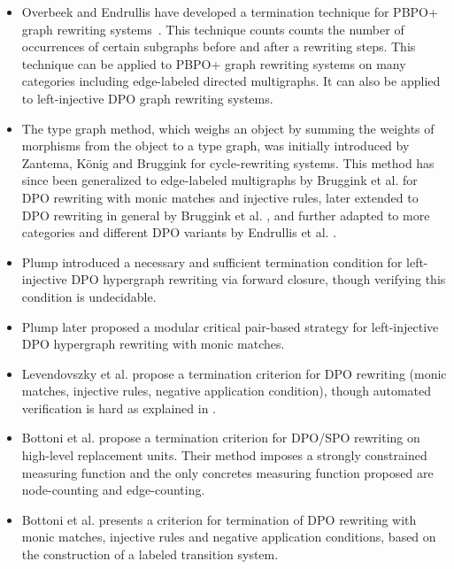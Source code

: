 \begin{itemize}
    \item Overbeek and Endrullis have developed a termination technique for PBPO+ graph rewriting systems~\cite{overbeek2024termination_lmcs}. This technique counts counts the number of occurrences of certain subgraphs before and after a rewriting steps. This technique can be applied to PBPO+ graph rewriting systems on many categories including edge-labeled directed multigraphs. It can also be applied to left-injective DPO graph rewriting systems.
    \item The type graph method, which weighs an object by summing the weights of morphisms from the object to a type graph, was initially introduced by Zantema, K{\"o}nig and Bruggink \cite{zantema2014termination} for cycle-rewriting systems. 
    This method has since been generalized to edge-labeled multigraphs by Bruggink et al. \cite{bruggink2014termination} for DPO rewriting with monic matches and injective rules, later extended to DPO rewriting in general by Bruggink et al. \cite{bruggink2015proving}, and further adapted to more categories and different DPO variants by Endrullis et al. \cite{endrullis2024generalized_arxiv_v2}. 
    \item Plump \cite{plump1995ontermination} introduced a necessary and sufficient termination condition for left-injective DPO hypergraph rewriting via forward closure, though verifying this condition is undecidable. 
    \item Plump \cite{plump2018modular} later proposed a modular critical pair-based strategy for left-injective DPO hypergraph rewriting with monic matches. 
    \item Levendovszky et al. \cite{levendovszky2007termination} propose a termination criterion for DPO rewriting (monic matches, injective rules, negative application condition), though automated verification is hard as explained in \cite[]{levendovszky2007termination}. 
    \item Bottoni et al. \cite{bottoni2005termination} propose a termination criterion for DPO/SPO rewriting on high-level replacement units. Their method imposes a strongly constrained measuring function and the only concretes measuring function proposed are node-counting and edge-counting.
    \item Bottoni et al. \cite{bottoni2010atermination} presents a criterion for termination of DPO rewriting with monic matches, injective rules and negative application conditions, based on the construction of a labeled transition system. 
\end{itemize}

